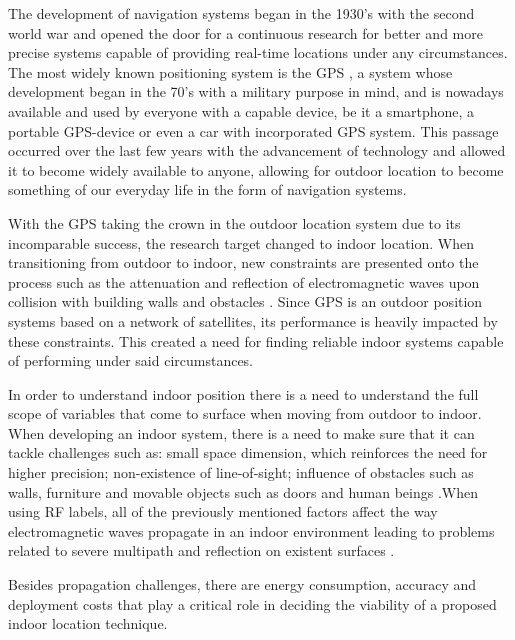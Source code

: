 \label{cap:int} 
 
 
The development of navigation systems began in the 1930's with the second world war and opened the door for a continuous research for better and more precise systems capable of providing real-time locations under any circumstances. The most widely known positioning system is the \ac{GPS} \cite{gps}, a system whose development began in the 70's with a military purpose in mind, and is nowadays available and used by everyone with a capable device, be it a smartphone, a portable \ac{GPS}-device or even a car with incorporated \ac{GPS} system. This passage occurred over the last few years with the advancement of technology and allowed it to become widely available to anyone, allowing for outdoor location to become something of our everyday life in the form of navigation systems. 
 
 
With the \ac{GPS} taking the crown in the outdoor location system due to its incomparable success, the research target changed to indoor location. When transitioning from outdoor to indoor, new constraints are presented onto the process such as the attenuation and reflection of electromagnetic waves upon collision with building walls and obstacles \cite{survey2}. Since \ac{GPS} is an outdoor position systems based on a network of satellites, its performance is heavily impacted by these constraints. This created a need for finding reliable indoor systems capable of performing under said circumstances. 
 
 
In order to understand indoor position there is a need to understand the full scope of variables that come to surface when moving from outdoor to indoor. When developing an indoor system, there is a need to make sure that it can tackle challenges such as: small space dimension, which reinforces the need for higher precision; non-existence of line-of-sight; influence of obstacles such as walls, furniture and movable objects such as doors and human beings \cite{reviewtechniques}.When using RF labels, all of the previously mentioned factors affect the way electromagnetic waves propagate in an indoor environment leading to problems related to severe multipath and reflection on existent surfaces \cite{surveythesis}.  
 
 
Besides propagation challenges, there are energy consumption, accuracy and deployment costs that play a critical role in deciding the viability of a proposed indoor location technique. 
 
